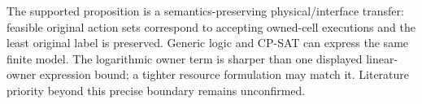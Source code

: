 The supported proposition is a semantics-preserving physical/interface transfer:
feasible original action sets correspond to accepting owned-cell executions and
the least original label is preserved. Generic logic and CP-SAT can express the
same finite model. The logarithmic owner term is sharper than one displayed
linear-owner expression bound; a tighter resource formulation may match it.
Literature priority beyond this precise boundary remains unconfirmed.
